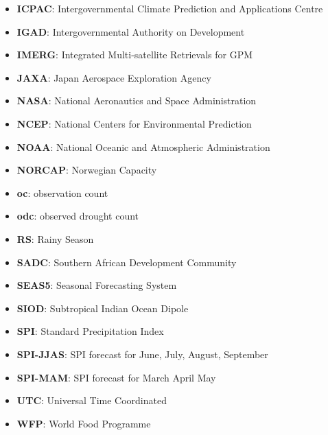 \documentclass{article}
\begin{document}
\begin{itemize}
\item {\bf ICPAC}: Intergovernmental Climate Prediction and Applications Centre
\item {\bf IGAD}: Intergovernmental Authority on Development
\item {\bf IMERG}: Integrated Multi-satellite Retrievals for GPM
\item {\bf JAXA}: Japan Aerospace Exploration Agency
\item {\bf NASA}: National Aeronautics and Space Administration
\item {\bf NCEP}: National Centers for Environmental Prediction
\item {\bf NOAA}: National Oceanic and Atmospheric Administration
\item {\bf NORCAP}: Norwegian Capacity
\item {\bf oc}: observation count
\item {\bf odc}: observed drought count
\item {\bf RS}: Rainy Season
\item {\bf SADC}: Southern African Development Community
\item {\bf SEAS5}: Seasonal Forecasting System
\item {\bf SIOD}: Subtropical Indian Ocean Dipole
\item {\bf SPI}: Standard Precipitation Index
\item {\bf SPI-JJAS}: SPI forecast for June, July, August, September
\item {\bf SPI-MAM}: SPI forecast for  March April May
\item {\bf UTC}: Universal Time Coordinated
\item {\bf WFP}: World Food Programme
\end{itemize}
\end{document}
